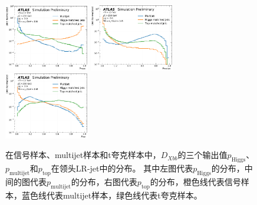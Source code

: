 \begin{figure}[h]
    \includegraphics[width=0.33\textwidth]{figuresXbb/samples/probs_aux/Xbb_Higgs_norm.pdf}
    \includegraphics[width=0.33\textwidth]{figuresXbb/samples/probs_aux/Xbb_QCD_norm.pdf}
    \includegraphics[width=0.33\textwidth]{figuresXbb/samples/probs_aux/Xbb_Top_norm.pdf}
  \caption{
  在信号样本、multijet样本和t夸克样本中，$D_{Xbb}$的三个输出值$p_{\text{Higgs}}$、$p_{\text{multijet}}$和$p_{\text{top}}$在领头LR-jet中的分布。
其中左图代表$p_{\text{Higgs}}$的分布，中间的图代表$p_{\text{multijet}}$的分布，右图代表$p_{\text{top}}$的分布，橙色线代表信号样本，蓝色线代表multijet样本，绿色线代表t夸克样本。
}
  \label{fig:DXBBPP}
\end{figure}

